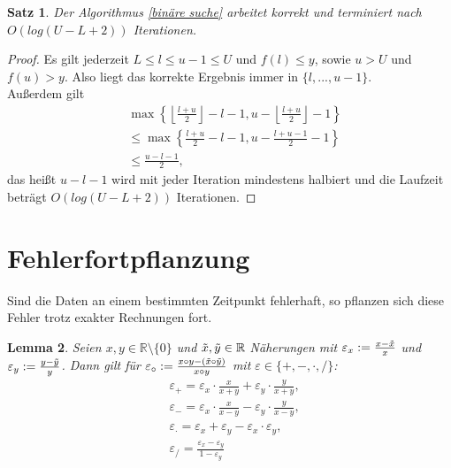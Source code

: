 \documentclass[12pt]{article}
\newcommand{\R}{\mathbb{R}} %
\newtheorem{satz}{Satz}[section]
\newtheorem{lemma}[satz]{Lemma}
\begin{document}
\begin{satz}
    Der Algorithmus \ref{binäre suche} arbeitet korrekt und terminiert nach $O(log(U-L+2))$ Iterationen.  
\end{satz}

\begin{proof}
    Es gilt jederzeit $L \leq l \leq u-1 \leq U$ und $f(l) \leq y$, sowie $u>U$ und $f(u)>y$. Also liegt das korrekte Ergebnis immer in $\{l,...,u-1\}$. \\ 
    Außerdem gilt 
    \begin{align*}
        &\max\left\{ \left\lfloor \frac{l+u}{2}\right\rfloor -l-1, u- \left\lfloor \frac{l+u}{2} \right\rfloor -1 \right\} \\ &\leq \max \left\{ \frac{l+u}{2}-l-1, u- \frac{l+u-1}{2}-1 \right\} \\
        &\leq \frac{u-l-1}{2},
    \end{align*}
    das heißt $u-l-1$ wird mit jeder Iteration mindestens halbiert und die Laufzeit beträgt $O(log(U-L+2))$ Iterationen.
\end{proof}

\newpage
\section{Fehlerfortpflanzung}
Sind die Daten an einem bestimmten Zeitpunkt fehlerhaft, so pflanzen sich diese Fehler trotz exakter Rechnungen fort. \\ 
\begin{lemma}
    Seien $x,y \in \R\setminus\{0\}$ und $\Tilde{x}, \Tilde{y} \in \R$ Näherungen mit $\varepsilon_x:= \frac{x- \Tilde{x}}{x}$ und $\varepsilon_y:= \frac{y- \Tilde{y}}{y}$. Dann gilt für $\varepsilon_\circ := \frac{x \circ y- (\Tilde{x} \circ \Tilde{y})}{x \circ y}$ mit $\varepsilon \in \{+,-,\cdot,/\}$: 
    \begin{align*}
        &\varepsilon_+= \varepsilon_x \cdot \frac{x}{x+y}+ \varepsilon_y \cdot \frac{y}{x+y}, \\
        &\varepsilon_-= \varepsilon_x \cdot \frac{x}{x-y}- \varepsilon_y \cdot \frac{y}{x-y}, \\
        &\varepsilon_{\cdot}= \varepsilon_x + \varepsilon_y- \varepsilon_x \cdot \varepsilon_y, \\
        &\varepsilon_/ = \frac{\varepsilon_x- \varepsilon_y}{1- \varepsilon_y}
    \end{align*}
\end{lemma}
\end{document}

